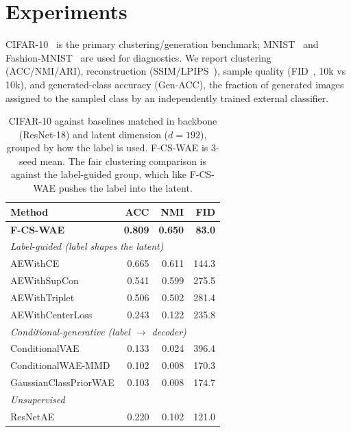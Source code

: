 \documentclass[letterpaper]{article}
\newcommand{\ours}{F-CS-WAE}
\begin{document}
\section{Experiments}

CIFAR-10~\citep{krizhevsky2009learning} is the primary
clustering/generation benchmark; MNIST~\citep{lecun1998gradient} and
Fashion-MNIST~\citep{xiao2017fashion} are used for diagnostics. We report
clustering (ACC/NMI/ARI), reconstruction (SSIM/LPIPS~\citep{zhang2018unreasonable}),
sample quality (FID~\citep{heusel2017gans}, 10k vs 10k), and generated-class
accuracy (Gen-ACC), the fraction of generated images assigned to the sampled
class by an independently trained external classifier.

\begin{table}[t]
\centering
\small
\setlength{\tabcolsep}{5pt}
\caption{CIFAR-10 against baselines matched in backbone (ResNet-18) and
latent dimension ($d{=}192$), grouped by how the label is used. \ours{} is
3-seed mean. The fair clustering comparison is against the label-guided
group, which like \ours{} pushes the label into the latent.}
\label{tab:cifar-main}
\begin{tabular}{lrrr}
\toprule
Method & ACC & NMI & FID \\
\midrule
\textbf{\ours{}} & \textbf{0.809} & \textbf{0.650} & \textbf{83.0} \\
\midrule
\multicolumn{4}{l}{\emph{Label-guided (label shapes the latent)}} \\
AEWithCE & 0.665 & 0.611 & 144.3 \\
AEWithSupCon & 0.541 & 0.599 & 275.5 \\
AEWithTriplet & 0.506 & 0.502 & 281.4 \\
AEWithCenterLoss & 0.243 & 0.122 & 235.8 \\
\multicolumn{4}{l}{\emph{Conditional-generative (label $\to$ decoder)}} \\
ConditionalVAE & 0.133 & 0.024 & 396.4 \\
ConditionalWAE-MMD & 0.102 & 0.008 & 170.3 \\
GaussianClassPriorWAE & 0.103 & 0.008 & 174.7 \\
\multicolumn{4}{l}{\emph{Unsupervised}} \\
ResNetAE & 0.220 & 0.102 & 121.0 \\
\bottomrule
\end{tabular}
\end{table}
\end{document}
